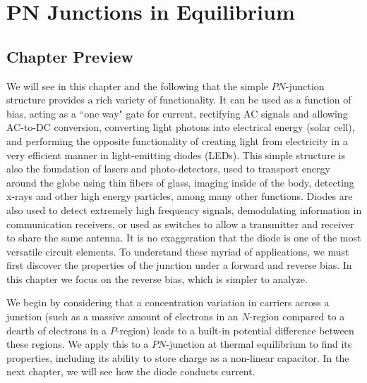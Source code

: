 \chapter{PN Junctions in Equilibrium}
\label{ch:ch05_pn_junc}
\graphicspath{{./figs_pn_junc/}}
\section{Chapter Preview}
We will see in this chapter and the following that the simple $PN$-junction structure provides a rich variety of functionality.  It can be used as a function of bias, acting as a ``one way" gate for current, rectifying AC signals and allowing AC-to-DC conversion, converting light photons into electrical energy (solar cell), and performing the opposite functionality of creating light from electricity in a very efficient manner in light-emitting diodes (LEDs).  This simple structure is also the foundation of lasers and photo-detectors, used to transport energy around the globe using thin fibers of glass, imaging inside of the body, detecting x-rays and other high energy particles, among many other functions.  Diodes are also used to detect extremely high frequency signals, demodulating information in communication receivers, or used as switches to allow a transmitter and receiver to share the same antenna.  It is no exaggeration that the diode is one of the most versatile circuit elements.  To understand these myriad of applications, we must first discover the properties of the junction under a forward and reverse bias.  In this chapter we focus on the reverse bias, which is simpler to analyze.

We begin by considering that a concentration variation in carriers across a junction (such as a massive amount of electrons in an $N$-region compared to a dearth of electrons in a $P$-region) leads to a built-in potential difference between these regions.  We apply this to a $PN$-junction at thermal equilibrium to find its properties, including its ability to store charge as a non-linear capacitor.  In the next chapter, we will see how the diode conducts current.
\newpage
